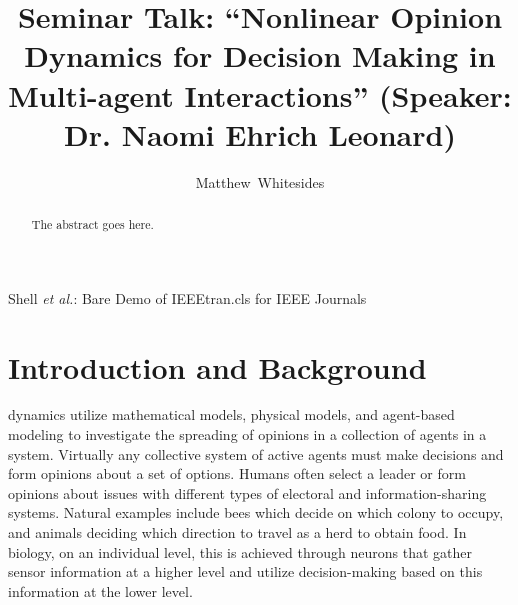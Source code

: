 \documentclass[journal,onecolumn]{IEEEtran}
\begin{document}
%
\title{Seminar Talk: ``Nonlinear Opinion Dynamics for Decision Making in Multi-agent Interactions'' (Speaker: Dr. Naomi Ehrich Leonard) }

%
%
%
\author{Matthew~Whitesides}%

%
{Shell \MakeLowercase{\textit{et al.}}: Bare Demo of IEEEtran.cls for IEEE Journals}

\maketitle

\begin{abstract}
The abstract goes here.
\end{abstract}


\IEEEpeerreviewmaketitle

\section{Introduction and Background}

 dynamics utilize mathematical models, physical models, and agent-based modeling to investigate the spreading of opinions in a collection of agents in a system. Virtually any collective system of active agents must make decisions and form opinions about a set of options. Humans often select a leader or form opinions about issues with different types of electoral and information-sharing systems. Natural examples include bees which decide on which colony to occupy, and animals deciding which direction to travel as a herd to obtain food. In biology, on an individual level, this is achieved through neurons that gather sensor information at a higher level and utilize decision-making based on this information at the lower level. 
\end{document}
